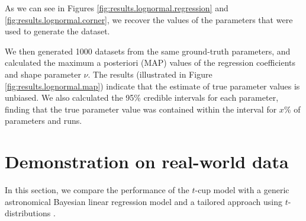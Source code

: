 \documentclass[fleqn,usenatbib]{mnras}
\begin{document}


As we can see in Figures \ref{fig:results.lognormal.regression} and
\ref{fig:results.lognormal.corner}, we recover the values of the parameters that were
used to generate the dataset.

We then generated 1000 datasets from the same ground-truth parameters, and
calculated the maximum a posteriori (MAP) values of the regression coefficients
and shape parameter $\nu$. The results (illustrated in Figure
\ref{fig:results.lognormal.map}) indicate that the estimate of true parameter values is
unbiased.{
\color{red} We also calculated the 95\% credible intervals for each parameter,
finding that the true parameter value was contained within the interval for
$x$\% of parameters and runs.
}



\section{Demonstration on real-world data}
\label{sec:real-world}


In this section, we compare the performance of the $t$-cup model with a generic
astronomical Bayesian linear regression model
\citep[\textsc{linmix\_err}][]{Kelly:2007} and a tailored approach using
$t$-distributions \citep{Park:2017}.
\end{document}
